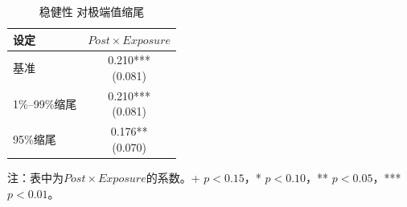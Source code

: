 \documentclass[a4paper,12pt]{report}
\begin{document}
\begin{table}[H]
\centering
\caption{稳健性 对极端值缩尾}
\label{tab:robust_winsor}
\begin{tabular*}{\textwidth}{@{\extracolsep{\fill}}lc}
\toprule
设定 & $Post\times Exposure$ \\
\midrule
基准 & \makecell{0.210***\\(0.081)} \\
1\%--99\%缩尾 & \makecell{0.210***\\(0.081)} \\
95\%缩尾 & \makecell{0.176**\\(0.070)} \\
\bottomrule
\end{tabular*}
\vspace{0.2cm}

\par\raggedright{} 注：表中为$Post\times Exposure$的系数。+ $p<0.15$，* $p<0.10$，** $p<0.05$，*** $p<0.01$。
\end{table}
\end{document}
